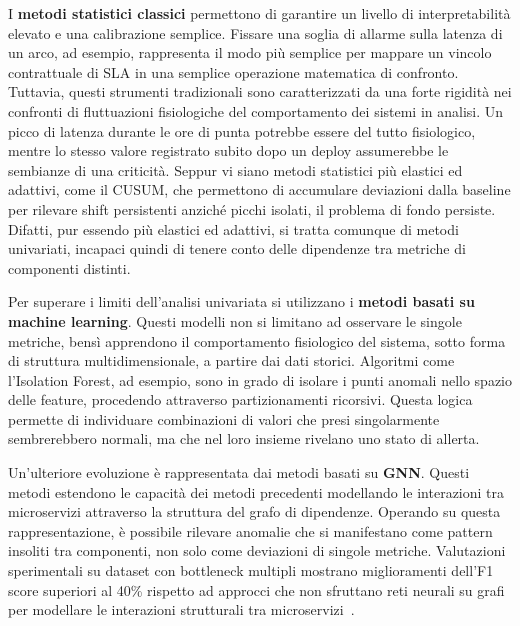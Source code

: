 I \textbf{metodi statistici classici} permettono di garantire un livello di interpretabilità elevato 
e una calibrazione semplice. Fissare una soglia di allarme sulla latenza di un arco, 
ad esempio, rappresenta il modo più semplice per mappare un vincolo contrattuale di \gls{SLA} 
in una semplice operazione matematica di confronto. Tuttavia, questi strumenti tradizionali 
sono caratterizzati da una forte rigidità nei confronti di fluttuazioni fisiologiche 
del comportamento dei sistemi in analisi. Un picco di latenza durante le ore di punta potrebbe 
essere del tutto fisiologico, mentre lo stesso valore registrato subito dopo un deploy 
assumerebbe le sembianze di una criticità. Seppur vi siano metodi statistici più elastici ed adattivi, 
come il CUSUM, che permettono di accumulare deviazioni dalla baseline per rilevare shift persistenti 
anziché picchi isolati, il problema di fondo persiste. Difatti, pur essendo più elastici ed adattivi, 
si tratta comunque di metodi univariati, incapaci quindi di tenere conto delle dipendenze 
tra metriche di componenti distinti.

Per superare i limiti dell'analisi univariata si utilizzano i \textbf{metodi basati su machine learning}. 
Questi modelli non si limitano ad osservare le singole metriche, bensì apprendono il comportamento 
fisiologico del sistema, sotto forma di struttura multidimensionale, a partire dai dati storici. 
Algoritmi come l'Isolation Forest, ad esempio, sono in grado di isolare i punti anomali nello spazio delle feature, 
procedendo attraverso partizionamenti ricorsivi. Questa logica permette di individuare combinazioni 
di valori che presi singolarmente sembrerebbero normali, ma che nel loro insieme rivelano uno stato di allerta.

Un'ulteriore evoluzione è rappresentata dai metodi basati su \textbf{\gls{GNN}}. Questi metodi estendono le capacità dei metodi 
precedenti modellando le interazioni tra microservizi attraverso la struttura del grafo di dipendenze. 
Operando su questa rappresentazione, è possibile rilevare anomalie che si manifestano come pattern 
insoliti tra componenti, non solo come deviazioni di singole metriche. Valutazioni sperimentali su 
dataset con bottleneck multipli mostrano miglioramenti dell'F1 score superiori al 40\% rispetto ad 
approcci che non sfruttano reti neurali su grafi per modellare le interazioni strutturali tra microservizi~\cite{somashekar2024gamma}. 

